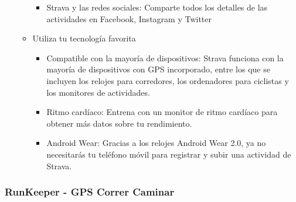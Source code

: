 \documentclass[a4paper, 11pt]{article}
\begin{document}
\begin{itemize}
\begin{itemize}
\begin{itemize}
                          \item {Strava y las redes sociales: Comparte todos los detalles de las actividades en Facebook, Instagram y Twitter}
                        \end{itemize}
                        \item {Utiliza tu tecnología favorita}
                        \begin{itemize}
                          \item {Compatible con la mayoría de dispositivos: Strava funciona con la mayoría de dispositivos con GPS incorporado, entre los que se incluyen los relojes para corredores, los ordenadores para ciclistas y los monitores de actividades.}
                          \item {Ritmo cardíaco: Entrena con un monitor de ritmo cardíaco para obtener más datos sobre tu rendimiento.}
                          \item {Android Wear: Gracias a los relojes Android Wear 2.0, ya no necesitarás tu teléfono móvil para registrar y subir una actividad de Strava.}
                        \end{itemize}
                      \end{itemize}
                \end{itemize}

          \subsubsection{RunKeeper - GPS Correr Caminar}
\end{document}
